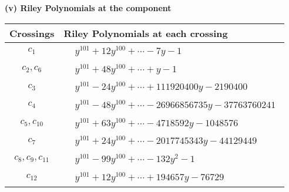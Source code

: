 \documentclass[1p]{elsarticle_modified}
\theoremstyle{definition}
\begin{document}
\newpage\renewcommand{\arraystretch}{1}
\flushleft \textbf{(v) Riley Polynomials at the component}\newline \\
\begin{tabular}{m{50pt}|m{274pt}}
Crossings & \hspace{64pt}Riley Polynomials at each crossing \\
\hline $$\begin{aligned}c_{1}\end{aligned}$$&$\begin{aligned}
&y^{101}+12 y^{100}+\cdots-7 y-1
\end{aligned}$\\
\hline $$\begin{aligned}c_{2},c_{6}\end{aligned}$$&$\begin{aligned}
&y^{101}+48 y^{100}+\cdots+y-1
\end{aligned}$\\
\hline $$\begin{aligned}c_{3}\end{aligned}$$&$\begin{aligned}
&y^{101}-24 y^{100}+\cdots+111920400 y-2190400
\end{aligned}$\\
\hline $$\begin{aligned}c_{4}\end{aligned}$$&$\begin{aligned}
&y^{101}-48 y^{100}+\cdots-26966856735 y-37763760241
\end{aligned}$\\
\hline $$\begin{aligned}c_{5},c_{10}\end{aligned}$$&$\begin{aligned}
&y^{101}+63 y^{100}+\cdots-4718592 y-1048576
\end{aligned}$\\
\hline $$\begin{aligned}c_{7}\end{aligned}$$&$\begin{aligned}
&y^{101}+24 y^{100}+\cdots-2017745343 y-44129449
\end{aligned}$\\
\hline $$\begin{aligned}c_{8},c_{9},c_{11}\end{aligned}$$&$\begin{aligned}
&y^{101}-99 y^{100}+\cdots-132 y^2-1
\end{aligned}$\\
\hline $$\begin{aligned}c_{12}\end{aligned}$$&$\begin{aligned}
&y^{101}+12 y^{100}+\cdots+194657 y-76729
\end{aligned}$\\
\hline
\end{tabular}\\~\\
\end{document}
